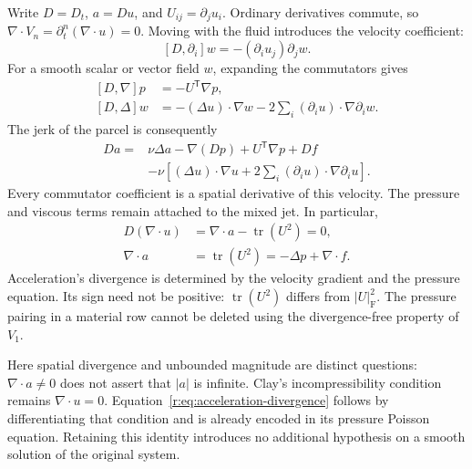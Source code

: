 Write \(D=D_t\), \(a=Du\), and \(U_{ij}=\partial_j u_i\).
Ordinary derivatives commute, so
\(\nabla\cdot V_n=\partial_t^n(\nabla\cdot u)=0\).
Moving with the fluid introduces the velocity coefficient:
\[
 [D,\partial_i]w=-(\partial_i u_j)\partial_jw.
\]
For a smooth scalar or vector field \(w\), expanding the commutators gives
\begin{equation}
 \begin{aligned}
 [D,\nabla]p&=-U^{\mathsf T}\nabla p,\\
 [D,\Delta]w&=-(\Delta u)\cdot\nabla w
 -2\sum_i(\partial_i u)\cdot\nabla\partial_i w.
 \end{aligned}
 \label{r:eq:material-commutators}
\end{equation}
The jerk of the parcel is consequently
\begin{equation}
 \begin{aligned}
 Da={}&\nu\Delta a-\nabla(Dp)+U^{\mathsf T}\nabla p+Df\\
 &-\nu\left[(\Delta u)\cdot\nabla u
 +2\sum_i(\partial_i u)\cdot\nabla\partial_i u\right].
 \end{aligned}
 \label{r:eq:material-jerk}
\end{equation}
Every commutator coefficient is a spatial derivative of this velocity.
The pressure and viscous terms remain attached to the mixed jet.
In particular,
\begin{equation}
 \begin{aligned}
 D(\nabla\cdot u)&=\nabla\cdot a-\operatorname{tr}(U^2)=0,\\
 \nabla\cdot a&=\operatorname{tr}(U^2)
              =-\Delta p+\nabla\cdot f .
 \end{aligned}
 \label{r:eq:acceleration-divergence}
\end{equation}
Acceleration's divergence is determined by the velocity gradient and
the pressure equation. Its sign need not be positive:
\(\operatorname{tr}(U^2)\) differs from \(|U|_{\mathrm F}^2\).
The pressure pairing in a material row cannot be deleted using the
divergence-free property of \(V_1\).

Here spatial divergence and unbounded magnitude are distinct questions:
\(\nabla\cdot a\ne0\) does not assert that \(|a|\) is infinite.
Clay's incompressibility condition remains \(\nabla\cdot u=0\).
Equation~\eqref{r:eq:acceleration-divergence} follows by differentiating
that condition and is already encoded in its pressure Poisson equation.
Retaining this identity introduces no additional hypothesis on a smooth
solution of the original system.

